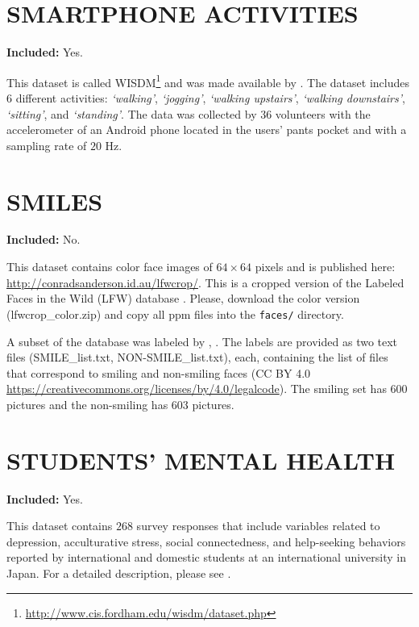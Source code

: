 \documentclass[
  11pt,
]{krantz}
\begin{document}
\hypertarget{smartphone-activities}{%
\section{SMARTPHONE ACTIVITIES}\label{smartphone-activities}}

\textbf{Included:} Yes.

This dataset is called WISDM\footnote{\url{http://www.cis.fordham.edu/wisdm/dataset.php}} and was made available by \citet{kwapisz2010}. The dataset includes \(6\) different activities: \emph{`walking'}, \emph{`jogging'}, \emph{`walking upstairs'}, \emph{`walking downstairs'}, \emph{`sitting'}, and \emph{`standing'}. The data was collected by \(36\) volunteers with the accelerometer of an Android phone located in the users' pants pocket and with a sampling rate of \(20\) Hz.

\hypertarget{smiles}{%
\section{SMILES}\label{smiles}}

\textbf{Included:} No.

This dataset contains color face images of \(64 \times 64\) pixels and is published here: \url{http://conradsanderson.id.au/lfwcrop/}. This is a cropped version \citep{sanderson2009multi} of the Labeled Faces in the Wild (LFW) database \citep{huang2008labeled}. Please, download the color version (lfwcrop\_color.zip) and copy all ppm files into the \texttt{faces/} directory.

A subset of the database was labeled by \citet{arigbabu2016smile}, \citet{olasimbo}. The labels are provided as two text files (SMILE\_list.txt, NON-SMILE\_list.txt), each, containing the list of files that correspond to smiling and non-smiling faces (CC BY 4.0 \url{https://creativecommons.org/licenses/by/4.0/legalcode}). The smiling set has \(600\) pictures and the non-smiling has \(603\) pictures.

\hypertarget{students-mental-health}{%
\section{STUDENTS' MENTAL HEALTH}\label{students-mental-health}}

\textbf{Included:} Yes.

This dataset contains \(268\) survey responses that include variables related to depression, acculturative stress, social connectedness, and help-seeking behaviors reported by international and domestic students at an international university in Japan. For a detailed description, please see \citep{Minh2019}.
\end{document}
